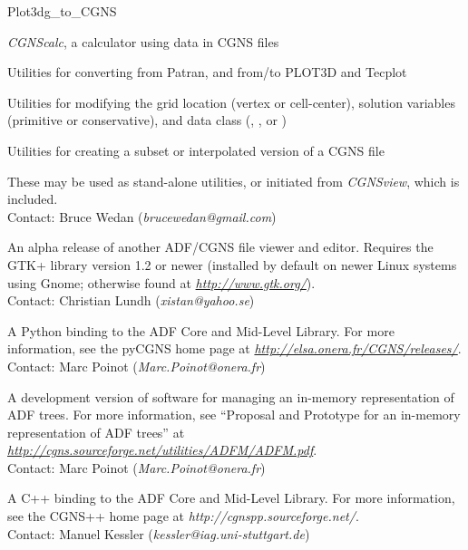 \begin{Ventryi}{Plot3dg\_to\_CGNS}
\begin{itemize*}
      \item \textit{CGNScalc}, a calculator using data in CGNS files
      \item Utilities for converting from Patran, and from/to PLOT3D and
            Tecplot
      \item Utilities for modifying the grid location
            (vertex or cell-center), solution variables
            (primitive or conservative), and data class
            (, , or
            )
      \item Utilities for creating a subset or interpolated version of
            a CGNS file
      \end{itemize*}
      These may be used as stand-alone utilities, or initiated from
      \textit{CGNSview}, which is included.\\
      Contact: Bruce Wedan (\textit{brucewedan@gmail.com})
\item [CGNS Viewer]
      An alpha release of another ADF/CGNS file viewer and editor.
      Requires the GTK+ library version 1.2 or newer (installed by default
      on newer Linux systems using Gnome; otherwise found at
      {\itshape\url{http://www.gtk.org/}}).\\
      Contact: Christian Lundh (\textit{xistan@yahoo.se})
\item [PyCGNS]
      A Python binding to the ADF Core and Mid-Level Library.
      For more information, see the pyCGNS home page at
      {\itshape\url{http://elsa.onera.fr/CGNS/releases/}}.\\
      Contact: Marc Poinot (\textit{Marc.Poinot@onera.fr})
\item [ADFM]
      A development version of software for managing an in-memory
      representation of ADF trees.
      For more information, see ``Proposal and Prototype for an in-memory
      representation of ADF trees'' at
      {\itshape\url{http://cgns.sourceforge.net/utilities/ADFM/ADFM.pdf}}.\\
      Contact: Marc Poinot (\textit{Marc.Poinot@onera.fr})
\item [CGNS++]
      A C++ binding to the ADF Core and Mid-Level Library.
      For more information, see the CGNS++ home page at
      \textit{http://cgnspp.sourceforge.net/}.\\
      Contact: Manuel Kessler (\textit{kessler@iag.uni-stuttgart.de})
\end{Ventryi}
